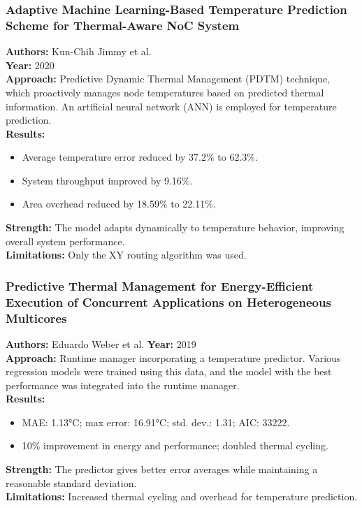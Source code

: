 \documentclass{beamer}
\begin{document}
\begin{frame}
\frametitle{Adaptive Machine Learning-Based Temperature Prediction Scheme for Thermal-Aware NoC System}

\textbf{Authors:} Kun-Chih Jimmy et al. \\
\textbf{Year:} 2020 \\[10pt]

\textbf{Approach:} Predictive Dynamic Thermal Management (PDTM) technique, which proactively manages node temperatures based on predicted thermal information. An artificial neural network (ANN) is employed for temperature prediction. \\[10pt]

\textbf{Results:}
\begin{itemize}
\item Average temperature error reduced by 37.2\% to 62.3\%.
\item System throughput improved by 9.16\%.
\item Area overhead reduced by 18.59\% to 22.11\%.
\end{itemize}

\textbf{Strength:} The model adapts dynamically to temperature behavior, improving overall system performance. \\[10pt]

\textbf{Limitations:} Only the XY routing algorithm was used.
\end{frame}

\begin{frame}
\frametitle{Predictive Thermal Management for Energy-Efficient Execution of Concurrent Applications on Heterogeneous Multicores}

\textbf{Authors:} Eduardo Weber et al.
\textbf{Year:} 2019 \\[10pt]

\textbf{Approach:} Runtime manager incorporating a temperature predictor. Various regression models were trained using this data, and the model with the best performance was integrated into the runtime manager. \\[10pt]

\textbf{Results:}
\begin{itemize}
\item MAE: 1.13°C; max error: 16.91°C; std. dev.: 1.31; AIC: 33222.
\item 10\% improvement in energy and performance; doubled thermal cycling.
\end{itemize}

\textbf{Strength:} The predictor gives better error averages while maintaining a reasonable standard deviation. \\[10pt]

\textbf{Limitations:} Increased thermal cycling and overhead for temperature prediction. \\[10pt]

\end{frame}
\end{document}
